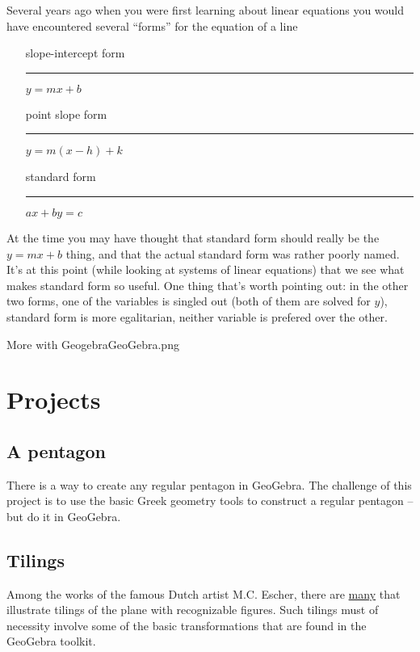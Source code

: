 Several years ago when you were first learning about linear equations you would have encountered several ``forms'' for the equation of a line

\begin{itemize}
	\item[slope-intercept form] \rule{0pt}{24pt} \rule{12pt}{0pt} $y = mx + b$
	\item[point slope form] \rule{0pt}{24pt} \rule{12pt}{0pt} $y = m(x - h) + k$
	\item[standard form] \rule{0pt}{24pt} \rule{12pt}{0pt} $ax + by = c$
\end{itemize}

At the time you may have thought that standard form should really be the $y=mx+b$ thing, and that the actual standard form was rather poorly named.  It's at this point (while looking at systems of linear equations) that we see what makes standard form so useful.  One thing that's worth pointing out: in the other two forms, one of the variables is singled out (both of them are solved for $y$), standard form is more egalitarian, neither variable is prefered over the other.

\clearpage
 \begin{worksheet}{17}{More with Geogebra}{GeoGebra.png}
 
 \end{worksheet}
\clearpage

\section{Projects}

\subsection{A pentagon}

There is a way to create any regular pentagon in GeoGebra.  The challenge of this project is to use the basic Greek geometry tools to construct a regular pentagon -- but do it in GeoGebra.

\subsection{Tilings}

Among the works of the famous Dutch artist M.C. Escher, there are \href{https://mcescher.com/gallery/symmetry/}{many} that illustrate tilings of the plane with recognizable figures.  Such tilings must of necessity involve some of the basic transformations that are found in the GeoGebra toolkit.

